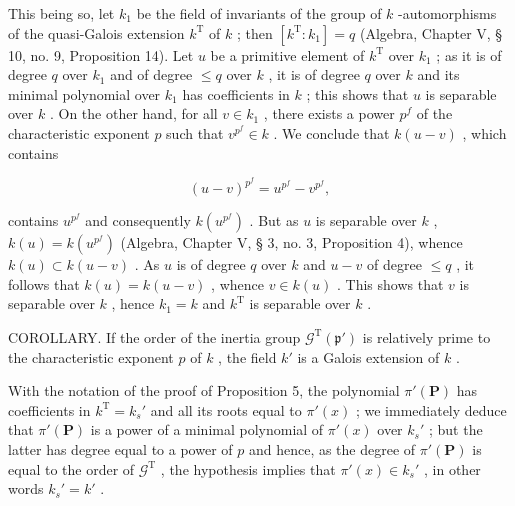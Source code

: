 This being so, let \(k_{1}\) be the field of invariants of the group of \(k\) -automorphisms of the quasi-Galois extension \(k^{\mathrm{T}}\) of \(k\) ; then \([k^{\mathrm{T}}:k_{1}] = q\) (Algebra, Chapter V, § 10, no. 9, Proposition 14). Let \(u\) be a primitive element of \(k^{\mathrm{T}}\) over \(k_{1}\) ; as it is of degree \(q\) over \(k_{1}\) and of degree \(\leqslant q\) over \(k\) , it is of degree \(q\) over \(k\) and its minimal polynomial over \(k_{1}\) has coefficients in \(k\) ; this shows that \(u\) is separable over \(k\) . On the other hand, for all \(v \in k_{1}\) , there exists a power \(p^{f}\) of the characteristic exponent \(p\) such that \(v^{p^{f}} \in k\) . We conclude that \(k(u - v)\) , which contains

\[
(u - v)^{p^{f}} = u^{p^{f}} - v^{p^{f}},
\]

contains \(u^{p^{f}}\) and consequently \(k(u^{p^{f}})\) . But as \(u\) is separable over \(k\) , \(k(u) = k(u^{p^{f}})\) (Algebra, Chapter V, § 3, no. 3, Proposition 4), whence \(k(u) \subset k(u - v)\) . As \(u\) is of degree \(q\) over \(k\) and \(u - v\) of degree \(\leqslant q\) , it follows that \(k(u) = k(u - v)\) , whence \(v \in k(u)\) . This shows that \(v\) is separable over \(k\) , hence \(k_1 = k\) and \(k^{\mathrm{T}}\) is separable over \(k\) .

COROLLARY. If the order of the inertia group \(\mathcal{G}^{\mathrm{T}}(\mathfrak{p}')\) is relatively prime to the characteristic exponent \(p\) of \(k\) , the field \(k'\) is a Galois extension of \(k\) .

With the notation of the proof of Proposition 5, the polynomial \(\pi'(\mathbf{P})\) has coefficients in \(k^{\mathrm{T}} = k_{s}'\) and all its roots equal to \(\pi'(x)\) ; we immediately deduce that \(\pi'(\mathbf{P})\) is a power of a minimal polynomial of \(\pi'(x)\) over \(k_{s}'\) ; but the latter has degree equal to a power of \(p\) and hence, as the degree of \(\pi'(\mathbf{P})\) is equal to the order of \(\mathcal{G}^{\mathrm{T}}\) , the hypothesis implies that \(\pi'(x) \in k_{s}'\) , in other words \(k_{s}' = k'\) .
\relax{}
